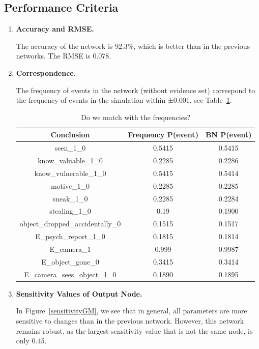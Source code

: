 \subsection{Performance Criteria}
\begin{enumerate}
\item \textbf{Accuracy and RMSE.}

The accuracy of the network is 92.3\%, which is better than in the previous networks. The RMSE is 0.078. 

\item \textbf{Correspondence.}

The frequency of events in the network (without evidence set) correspond to the frequency of events in the simulation within ±0.001, see Table~\ref{testTableGM}.

\begin{table}
\centering
\begin{tabular}{|c|c|c|}
 \hline
 Conclusion & Frequency P(event) & BN P(event)\\
 \hline
seen\_1\_0    & 0.5415& 0.5415\\
know\_valuable\_1\_0  & 0.2285 &  0.2286\\
know\_vulnerable\_1\_0  & 0.5415 &  0.5414\\
motive\_1\_0  & 0.2285 &  0.2285\\
sneak\_1\_0  & 0.2285 & 0.2284\\
stealing\_1\_0  & 0.19 & 0.1900\\
object\_dropped\_accidentally\_0  & 0.1515 & 0.1517 \\
E\_psych\_report\_1\_0  & 0.1815 &  0.1814\\
E\_camera\_1 & 0.999 & 0.9987\\ 
E\_object\_gone\_0  & 0.3415 & 0.3414 \\
E\_camera\_sees\_object\_1\_0  & 0.1890 & 0.1895 \\
 \hline
\end{tabular}
\caption{Do we match with the frequencies?}
\label{testTableGM}
\end{table}


\item \textbf{Sensitivity Values of Output Node.}

In Figure~\ref{sensitivityGM}, we see that in general, all parameters are more sensitive to changes than in the previous network. However, this network remains robust, as the largest sensitivity value that is not the same node, is only 0.45. 


\end{enumerate}
